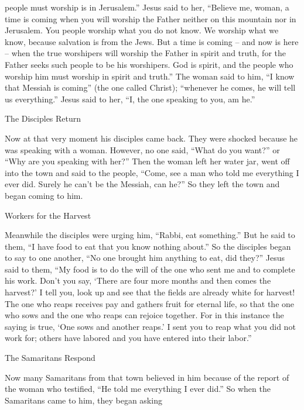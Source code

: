 {people must
worship
is
in
Jerusalem.”
Jesus
said
to her,
“Believe
me,
woman,
a time
is coming
when
you will worship
the Father
neither
on
this
mountain
nor
in
Jerusalem.
You people
worship
what
you do
not
know.
We
worship
what
we know,
because
salvation
is
from
the Jews.
But
a time
is coming
– and
now
is here – when the true worshipers will worship the Father in spirit and truth, for the Father seeks such people to be his worshipers.
God
is spirit,
and
the people who worship
him
must
worship
in
spirit
and
truth.”
The woman
said
to him,
“I know
that
Messiah
is coming”
(the one called
Christ); “whenever
he comes,
he will tell
us
everything.”
Jesus
said
to her,
“I,
the one speaking
to you,
am he.”
\par }{\SH The Disciples Return
\par }{\PP {}Now
at
that
very moment his
disciples
came back.
They were shocked
because
he was speaking
with
a woman.
However,
no one
said,
“What
do you want?” or
“Why
are you speaking
with
her?”
Then
the woman
left
her
water jar,
went off
into
the town
and
said
to the people,
“Come,
see
a man
who
told
me
everything
I ever did.
Surely he
can’t
be
the Messiah,
can he?”
So they left
the town
and
began coming
to
him.
\par }{\SH Workers for the Harvest
\par }{\PP {}Meanwhile
the disciples
were urging
him, “Rabbi,
eat something.”
But
he said
to them,
“I
have
food
to eat
that
you
know
nothing about.”
So
the disciples
began to say
to
one another,
“No
one
brought
him
anything to eat, did they?”
Jesus
said
to them,
“My
food
is
to
do
the will
of the one who sent
me
and
to complete
his
work.
Don’t
you
say, ‘There are
four
more
months
and
then comes
the harvest?’ I tell
you,
look up
and
see
that
the fields
are
already
white
for
harvest!
The one who reaps
receives
pay
and
gathers
fruit
for
eternal
life,
so that
the one who sows
and the one who reaps
can rejoice
together.
For
in this
instance the saying
is
true, ‘One sows
and
another
reaps.’
I
sent
you
to reap
what
you
did
not
work for;
others
have labored
and
you
have entered
into
their
labor.”
\par }{\SH The Samaritans Respond
\par }{\PP {}Now many
Samaritans
from
that
town
believed
in
him
because of
the report
of the woman
who testified, “He told
me
everything
I ever did.”
So
when
the Samaritans
came
to
him,
they began asking
}
